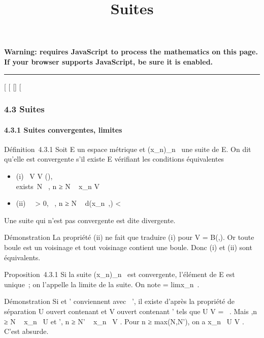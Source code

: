 \documentclass[]{article}
\title{Suites}
\author{}
\date{}
\begin{document}
\maketitle

\textbf{Warning: 
requires JavaScript to process the mathematics on this page.\\ If your
browser supports JavaScript, be sure it is enabled.}

\begin{center}\rule{3in}{0.4pt}\end{center}

{[}
{[}
{[}{]}
{[}

\subsubsection{4.3 Suites}

\paragraph{4.3.1 Suites convergentes, limites}

Définition~4.3.1 Soit E un espace métrique et
(x\_n)\_n\in{}~ une suite de E. On dit qu'elle est
convergente s'il existe \ell \in E vérifiant les conditions équivalentes

\begin{itemize}
\itemsep1pt\parskip0pt
\item
  (i) \forall~V \in V (\ell), \\exists~N
  \in {}~, n ≥ N \rigtharrow~ x\_n \in V
\item
  (ii) \forall~~\epsilon \textgreater{} 0,
  \existsN \in {}~, n ≥ N \rigtharrow~ d(x\_n~,\ell)
  \textless{} \epsilon
\end{itemize}

Une suite qui n'est pas convergente est dite divergente.

Démonstration La propriété (ii) ne fait que traduire (i) pour V =
B(\ell,\epsilon). Or toute boule est un voisinage et tout voisinage contient une
boule. Donc (i) et (ii) sont équivalents.

Proposition~4.3.1 Si la suite (x\_n)\_n\in{}~ est
convergente, l'élément \ell de E est unique~; on l'appelle la limite de la
suite. On note \ell = limx\_n~.

Démonstration Si \ell et \ell' conviennent avec \ell\neq~\ell', il existe d'après la
propriété de séparation U ouvert contenant \ell et V ouvert contenant \ell'
tels que U \bigcap V = \varnothing~. Mais
\existsN,\quad n ≥ N \rigtharrow~ x\_n~ \in
U et \existsN', n ≥ N' \rigtharrow~ x\_n~ \in V . Pour n
≥ max(N,N'), on a x\_n~ \in U \bigcap V . C'est
absurde.
\end{document}
